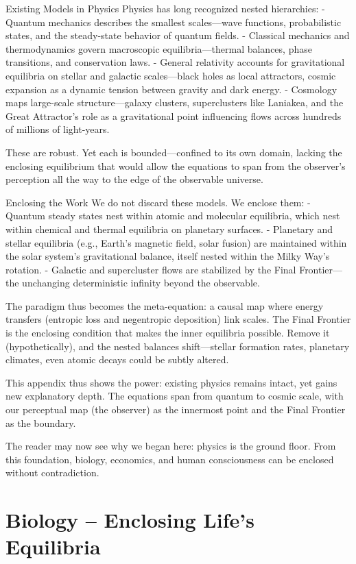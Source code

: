 Existing Models in Physics  
Physics has long recognized nested hierarchies:  
- Quantum mechanics describes the smallest scales—wave functions, probabilistic states, and the steady-state behavior of quantum fields.  
- Classical mechanics and thermodynamics govern macroscopic equilibria—thermal balances, phase transitions, and conservation laws.  
- General relativity accounts for gravitational equilibria on stellar and galactic scales—black holes as local attractors, cosmic expansion as a dynamic tension between gravity and dark energy.  
- Cosmology maps large-scale structure—galaxy clusters, superclusters like Laniakea, and the Great Attractor’s role as a gravitational point influencing flows across hundreds of millions of light-years.

These are robust. Yet each is bounded—confined to its own domain, lacking the enclosing equilibrium that would allow the equations to span from the observer’s perception all the way to the edge of the observable universe.

Enclosing the Work  
We do not discard these models. We enclose them:  
- Quantum steady states nest within atomic and molecular equilibria, which nest within chemical and thermal equilibria on planetary surfaces.  
- Planetary and stellar equilibria (e.g., Earth’s magnetic field, solar fusion) are maintained within the solar system’s gravitational balance, itself nested within the Milky Way’s rotation.  
- Galactic and supercluster flows are stabilized by the Final Frontier—the unchanging deterministic infinity beyond the observable.

The paradigm thus becomes the meta-equation: a causal map where energy transfers (entropic loss and negentropic deposition) link scales. The Final Frontier is the enclosing condition that makes the inner equilibria possible. Remove it (hypothetically), and the nested balances shift—stellar formation rates, planetary climates, even atomic decays could be subtly altered.

This appendix thus shows the power: existing physics remains intact, yet gains new explanatory depth. The equations span from quantum to cosmic scale, with our perceptual map (the observer) as the innermost point and the Final Frontier as the boundary.

The reader may now see why we began here: physics is the ground floor. From this foundation, biology, economics, and human consciousness can be enclosed without contradiction.

\chapter{Biology – Enclosing Life’s Equilibria}

